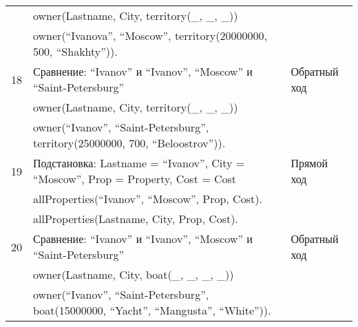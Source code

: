 {\begin{longtable}{|p{1.15cm}|p{8cm}|p{8cm}|}
       & owner(Lastname, City, territory(\_, \_, \_)) & \\
       & owner(``Ivanova'', ``Moscow'', territory(20000000, 500, ``Shakhty'')).& \\
    \hline
    18 & Сравнение: ``Ivanov'' и ``Ivanov'', ``Moscow'' и ``Saint-Petersburg'' & Обратный ход \\
       & owner(Lastname, City, territory(\_, \_, \_)) & \\
       & owner(``Ivanov'', ``Saint-Petersburg'', territory(25000000, 700, ``Beloostrov'')). & \\
    \hline
    19 & Подстановка: Lastname = ``Ivanov'', City = ``Moscow'', Prop = Property, Cost = Cost & Прямой ход \\
      & allProperties(``Ivanov'', ``Moscow'', Prop, Cost). & \\
      & allProperties(Lastname, City, Prop, Cost). & \\
    \hline
    20 & Сравнение: ``Ivanov'' и ``Ivanov'', ``Moscow'' и ``Saint-Petersburg'' & Обратный ход \\
       & owner(Lastname, City, boat(\_, \_, \_, \_)) & \\
       & owner(``Ivanov'', ``Saint-Petersburg'', boat(15000000, ``Yacht'', ``Mangusta'', ``White'')). & \\
    \hline
\end{longtable}
}
